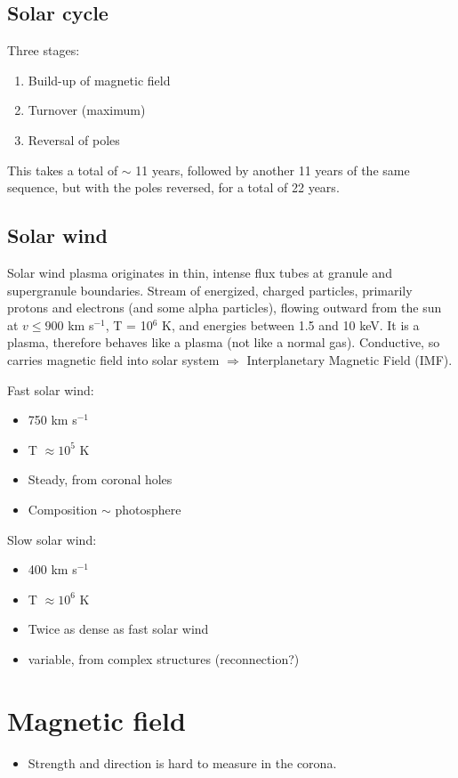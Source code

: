 \documentclass{article}
\begin{document}
\subsection{Solar cycle}
Three stages:
\begin{enumerate}
    \item Build-up of magnetic field
    \item Turnover (maximum)
    \item Reversal of poles
\end{enumerate}
This takes a total of $\sim$ 11 years, followed by another 11 years of the same
sequence, but with the poles reversed, for a total of 22 years.

\subsection{Solar wind}
Solar wind plasma originates in thin, intense flux tubes at granule
and supergranule boundaries.
Stream of energized, charged particles, primarily protons and electrons
(and some alpha particles),
flowing outward from the sun at $v \leq 900$ km s$^{-1}$, T = 10$^6$ K,
and energies between 1.5 and 10 keV.
It is a plasma, therefore behaves like a plasma (not like a normal gas).
Conductive, so
carries magnetic field into solar system $\Rightarrow$ Interplanetary
Magnetic Field (IMF).

Fast solar wind:
\begin{itemize}
    \item 750 km s$^{-1}$
    \item T $\approx 10^{5}$ K
    \item Steady, from coronal holes
    \item Composition $\sim$ photosphere
\end{itemize}

Slow solar wind:
\begin{itemize}
    \item 400 km s$^{-1}$
    \item T $\approx 10^{6}$ K
    \item Twice as dense as fast solar wind
    \item variable, from complex structures (reconnection?)
\end{itemize}

\section{Magnetic field}
\begin{itemize}
    \item Strength and direction is hard to measure in the corona.
\end{itemize}
\end{document}
